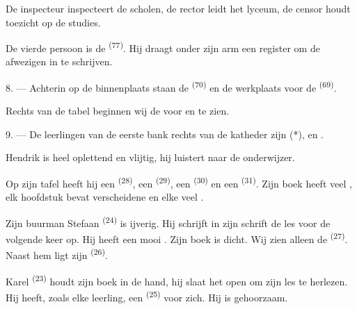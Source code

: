 De inspecteur inspecteert de scholen, de rector leidt het lyceum, de censor houdt toezicht op
de studies.

De vierde persoon is de  \textsuperscript{(77)}. Hij draagt onder zijn arm een
register om de afwezigen in te schrijven.

8. --- Achterin op de binnenplaats staan de 
\textsuperscript{(70)} en de werkplaats voor de  \textsuperscript{(69)}.

Rechts van de tabel beginnen wij de  voor  en
 te zien.


\VUsaut{2.4mm}

\VUsaut{3.0mm}

9. --- De leerlingen van de eerste bank rechts van de katheder zijn
 (*),  en .

Hendrik is heel oplettend en vlijtig, hij luistert naar de onderwijzer.

Op zijn tafel heeft hij een  \textsuperscript{(28)}, een
 \textsuperscript{(29)}, een 
\textsuperscript{(30)} en een  \textsuperscript{(31)}. Zijn boek heeft veel
, elk hoofdstuk bevat verscheidene
 en elke  veel .

Zijn buurman Stefaan \textsuperscript{(24)} is ijverig. Hij schrijft in zijn schrift de les
voor de volgende keer op. Hij heeft een mooi
. Zijn boek is dicht. Wij zien alleen de 
\textsuperscript{(27)}. Naast hem ligt zijn  \textsuperscript{(26)}.

Karel \textsuperscript{(23)} houdt zijn boek in de hand, hij slaat het open om zijn les te
herlezen. Hij heeft, zoals elke leerling, een  \textsuperscript{(25)} voor
zich. Hij is gehoorzaam.


